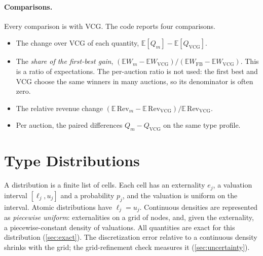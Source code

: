 \documentclass[11pt]{article}
\begin{document}
\paragraph{Comparisons.} Every comparison is with VCG. The code reports four comparisons.
\begin{itemize}
    \item The change over VCG of each quantity, $\mathbb{E}[Q_m]-\mathbb{E}[Q_{\mathrm{VCG}}]$.
    \item The \emph{share of the first-best gain}, $(\mathbb{E}W_m-\mathbb{E}W_{\mathrm{VCG}})/(\mathbb{E}W_{\mathrm{FB}}-\mathbb{E}W_{\mathrm{VCG}})$. This is a ratio of expectations. The per-auction ratio is not used: the first best and VCG choose the same winners in many auctions, so its denominator is often zero.
    \item The relative revenue change $(\mathbb{E}\,\mathrm{Rev}_m-\mathbb{E}\,\mathrm{Rev}_{\mathrm{VCG}})/\mathbb{E}\,\mathrm{Rev}_{\mathrm{VCG}}$.
    \item Per auction, the paired differences $Q_m-Q_{\mathrm{VCG}}$ on the same type profile.
\end{itemize}

\section{Type Distributions}\label{sec:distributions}

A distribution is a finite list of cells. Each cell has an externality $e_j$, a valuation interval $[\ell_j,u_j]$ and a probability $p_j$, and the valuation is uniform on the interval. Atomic distributions have $\ell_j=u_j$. Continuous densities are represented as \emph{piecewise uniform}: externalities on a grid of nodes, and, given the externality, a piecewise-constant density of valuations. All quantities are exact for this distribution (\cref{sec:exact}). The discretization error relative to a continuous density shrinks with the grid; the grid-refinement check measures it (\cref{sec:uncertainty}).
\end{document}
